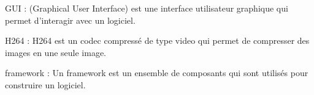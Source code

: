     \begin{definition}
        \newcommand{\lab}[6]{(\ref{#6})}

        GUI : (Graphical User Interface) est une interface utilisateur graphique qui permet d'interagir avec un logiciel.

        \label{def:GUI}
    \end{definition}

    \begin{definition}
        \newcommand{\lab}[7]{(\ref{#7})}

        H264 : H264 est un codec compressé de type video qui permet de compresser des images en une seule image.

        \label{def:H}
    \end{definition}

    \begin{definition}
        \newcommand{\lab}[8]{(\ref{#8})}

        framework : Un framework est un ensemble de composants qui sont utilisés pour construire un logiciel.

        \label{def:framework}
    \end{definition}




